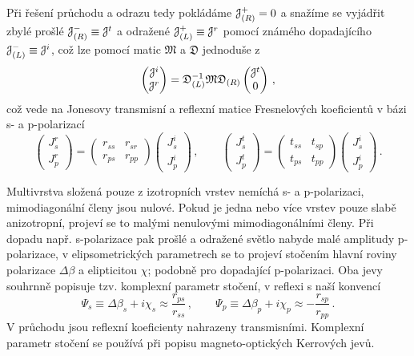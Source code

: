 Při řešení průchodu a odrazu tedy pokládáme $\mathcal{J}^+_{(R)}=0$ a snažíme se vyjádřit zbylé prošlé $\mathcal{J}^-_{(R)} \equiv \mathcal{J}^t$ a odražené $\mathcal{J}^+_{(L)} \equiv \mathcal{J}^r$ pomocí známého dopadajícího $\mathcal{J}^-_{(L)} \equiv \mathcal{J}^i$, což lze pomocí matic $\mathfrak{M}$ a $\mathfrak{D}$ jednoduše z
\begin{equation}
    \begin{pmatrix} \mathcal{J}^i \\ \mathcal{J}^r \end{pmatrix}
    =\mathfrak{D}_{(L)}^{-1} \mathfrak{M} \mathfrak{D}_{(R)} 
    \begin{pmatrix} \mathcal{J}^t \\ 0 \end{pmatrix} \,,
\end{equation}
což vede na Jonesovy transmisní a reflexní matice Fresnelových koeficientů v bázi s- a p-polarizací
\begin{equation}
    \begin{pmatrix} J^r_s \\ J^r_p \end{pmatrix}
        =\begin{pmatrix} r_{ss} & r_{sr} \\ r_{ps} & r_{pp} \end{pmatrix}
        \begin{pmatrix} J^i_s \\ J^i_p \end{pmatrix} 
        \,, \qquad \begin{pmatrix} J^t_s \\ J^t_p \end{pmatrix}
        =\begin{pmatrix} t_{ss} & t_{sp} \\ t_{ps} & t_{pp} \end{pmatrix}
        \begin{pmatrix} J^i_s \\ J^i_p \end{pmatrix} \,.
\end{equation}

Multivrstva složená pouze z izotropních vrstev nemíchá s- a p-polarizaci, mimodiagonální členy jsou nulové.
Pokud je jedna nebo více vrstev pouze slabě anizotropní, projeví se to malými nenulovými mimodiagonálními členy.
Při dopadu např. s-polarizace pak prošlé a odražené světlo nabyde malé amplitudy p-polarizace, v elipsometrických parametrech se to projeví stočením hlavní roviny polarizace $\Delta \beta$ a elipticitou $\chi$; podobně pro dopadající p-polarizaci. 
Oba jevy souhrnně popisuje tzv. komplexní parametr stočení\cite{silberQuadraticMagnetoopticKerr2019a}, v reflexi s naší konvencí
\begin{equation}
\label{eqn:komplexni-rotace}
    \Psi_s \equiv \Delta \beta_s + i \chi_s \approx \frac{r_{ps}}{r_{ss}} 
    \,, \qquad \Psi_p \equiv \Delta \beta_p + i \chi_p \approx -\frac{r_{sp}}{r_{pp}} \,.
\end{equation}
V průchodu jsou reflexní koeficienty nahrazeny transmisními.
Komplexní parametr stočení se používá při popisu magneto-optických Kerrových jevů.
